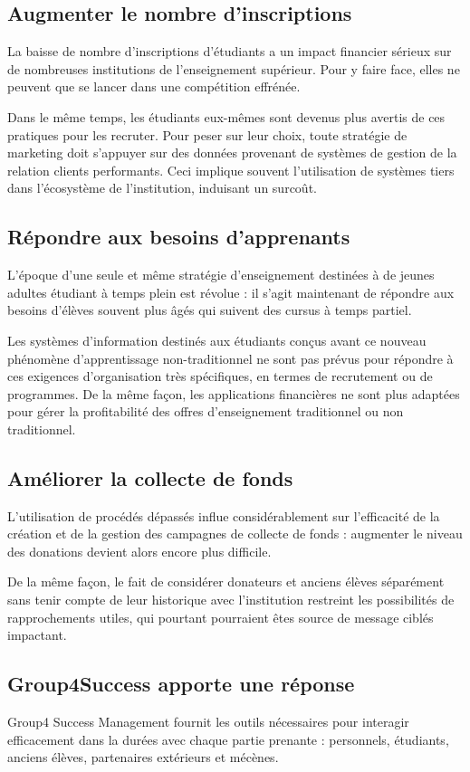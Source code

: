 \subsection{Augmenter le nombre d'inscriptions}
La baisse de nombre d'inscriptions d'étudiants a un impact financier sérieux sur de nombreuses institutions de l'enseignement supérieur. Pour y faire face, elles ne peuvent que se lancer dans une compétition effrénée.
\medskip

Dans le même temps, les étudiants eux-mêmes sont devenus plus avertis de ces pratiques pour les recruter. Pour peser sur leur choix, toute stratégie de marketing doit s'appuyer sur des données provenant de systèmes de gestion de la relation clients performants. Ceci implique souvent l'utilisation de systèmes tiers dans l'écosystème de l'institution, induisant un surcoût.

\subsection{Répondre aux besoins d'apprenants}
L'époque d'une seule et même stratégie d'enseignement destinées à de jeunes adultes étudiant à temps plein est révolue : il s'agit maintenant de répondre aux besoins d'élèves souvent plus âgés qui suivent des cursus à temps partiel.
\medskip

Les systèmes d'information destinés aux étudiants conçus avant ce nouveau phénomène d'apprentissage non-traditionnel ne sont pas prévus pour répondre à ces exigences d'organisation très spécifiques, en termes de recrutement ou de programmes. De la même façon, les applications financières ne sont plus adaptées pour gérer la profitabilité des offres d'enseignement traditionnel ou non traditionnel.

\subsection{Améliorer la collecte de fonds}
L'utilisation de procédés dépassés influe considérablement sur l'efficacité de la création et de la gestion des campagnes de collecte de fonds : augmenter le niveau des donations devient alors encore plus difficile.
\medskip

De la même façon, le fait de considérer donateurs et anciens élèves séparément sans tenir compte de leur historique avec l'institution restreint les possibilités de rapprochements utiles, qui pourtant pourraient êtes source de message ciblés impactant.

\subsection{Group4Success apporte une réponse}
Group4 Success Management fournit les outils nécessaires pour interagir efficacement dans la durées avec chaque partie prenante : personnels, étudiants, anciens élèves, partenaires extérieurs et mécènes.
\medskip

